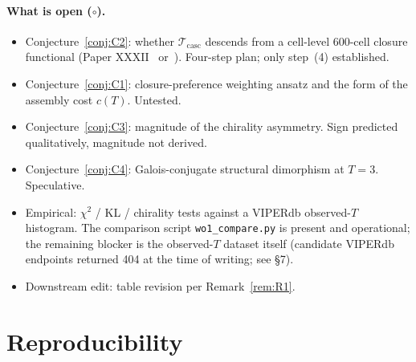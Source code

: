 \documentclass[12pt]{article}
\newcommand{\Tcasc}{\mathcal{T}_{\mathrm{casc}}}
\begin{document}
\paragraph{What is open ($\circ$).}
\begin{itemize}
\item Conjecture~\ref{conj:C2}: whether $\Tcasc$ descends from a
cell-level 600-cell closure functional (Paper XXXII~\cite{SmartXXXII}
or~\cite[\S F2]{CascadeFoundations}). Four-step plan; only step~(4)
established.
\item Conjecture~\ref{conj:C1}: closure-preference weighting ansatz
and the form of the assembly cost $c(T)$. Untested.
\item Conjecture~\ref{conj:C3}: magnitude of the chirality asymmetry.
Sign predicted qualitatively, magnitude not derived.
\item Conjecture~\ref{conj:C4}: Galois-conjugate structural
dimorphism at $T = 3$. Speculative.
\item Empirical: $\chi^2$ / KL / chirality tests against a VIPERdb
observed-$T$ histogram. The comparison script
\texttt{wo1\_compare.py} is present and operational; the remaining
blocker is the observed-$T$ dataset itself (candidate VIPERdb
endpoints returned 404 at the time of writing; see §7).
\item Downstream edit: \cite[\S B3.2]{CascadeBio} table revision per
Remark~\ref{rem:R1}.
\end{itemize}

\section{Reproducibility}\label{sec:repro}
\end{document}
